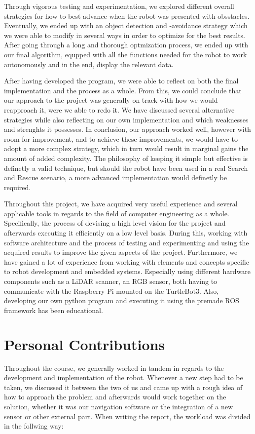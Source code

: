 \documentclass[conference]{IEEEtran}
\begin{document}
Through vigorous testing and experimentation, we explored different overall strategies for how to best advance when the robot was presented with obsstacles.
Eventually, we ended up with an object detection and -avoidance strategy which we were able to modify in several ways in order to optimize for the best results.
After going through a long and thorough optmization process, we ended up with our final algorithm, equpped with all the functions needed for the robot to work autonomously and in the end, display the relevant data.

After having developed the program, we were able to reflect on both the final implementation and the process as a whole.
From this, we could conclude that our approach to the project was generally on track with how we would reapproach it, were we able to redo it.
We have discussed several alternative strategies while also reflecting on our own implementation and which weaknesses and strenghts it possesses.
In conclusion, our approach worked well, however with room for improvement, and to achieve these improvements, we would have to adopt a more complex strategy, which in turn would result in marginal gains the amount of added complexity.
The philosophy of keeping it simple but effective is definetly a valid technique, but should the robot have been used in a real Search and Rescue scenario, a more advanced implementation would definetly be required.

Throughout this project, we have acquired very useful experience and several applicable tools in regards to the field of computer engineering as a whole.
Specifically, the process of devising a high level vision for the project and afterwards executing it efficiently on a low level basis.
During this, working with software architecture and the process of testing and experimenting and using the acquired results to improve the given aspects of the project.
Furthermore, we have gained a lot of experience from working with elements and concepts specific to robot development and embedded systems.
Especially using different hardware components such as a LiDAR scanner, an RGB sensor, both having to communicate with the Raspberry Pi mounted on the TurtleBot3.
Also, developing our own python program and executing it using the premade ROS framework has been educational.

\section{Personal Contributions}
Throughout the course, we generally worked in tandem in regards to the development and implementation of the robot.
Whenever a new step had to be taken, we discussed it between the two of us and came up with a rough idea of how to approach the problem and afterwards would work together on the solution, whether it was our navigation software or the integration of a new sensor or other external part.
When writing the report, the workload was divided in the follwing way:
\end{document}
